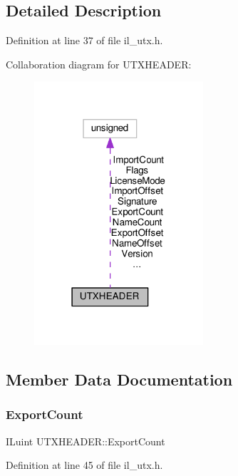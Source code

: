 \subsection{Detailed Description}


Definition at line 37 of file il\+\_\+utx.\+h.



Collaboration diagram for U\+T\+X\+H\+E\+A\+D\+ER\+:
\nopagebreak
\begin{figure}[H]
\begin{center}
\leavevmode
\includegraphics[width=178pt]{d4/d7b/structUTXHEADER__coll__graph}
\end{center}
\end{figure}


\subsection{Member Data Documentation}
\mbox{\label{structUTXHEADER_a9a3b53126ce6888e09ab55c78b1aebb8}} 
\subsubsection{\texorpdfstring{Export\+Count}{ExportCount}}
{\footnotesize\ttfamily I\+Luint U\+T\+X\+H\+E\+A\+D\+E\+R\+::\+Export\+Count}



Definition at line 45 of file il\+\_\+utx.\+h.


